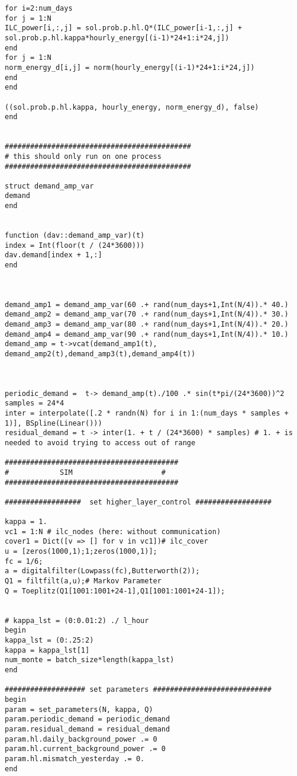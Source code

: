 \begin{lstlisting}
for i=2:num_days
for j = 1:N
ILC_power[i,:,j] = sol.prob.p.hl.Q*(ILC_power[i-1,:,j] +  sol.prob.p.hl.kappa*hourly_energy[(i-1)*24+1:i*24,j])
end
for j = 1:N
norm_energy_d[i,j] = norm(hourly_energy[(i-1)*24+1:i*24,j])
end
end

((sol.prob.p.hl.kappa, hourly_energy, norm_energy_d), false)
end


############################################
# this should only run on one process
############################################

struct demand_amp_var
demand
end


function (dav::demand_amp_var)(t)
index = Int(floor(t / (24*3600)))
dav.demand[index + 1,:]
end



demand_amp1 = demand_amp_var(60 .+ rand(num_days+1,Int(N/4)).* 40.)
demand_amp2 = demand_amp_var(70 .+ rand(num_days+1,Int(N/4)).* 30.)
demand_amp3 = demand_amp_var(80 .+ rand(num_days+1,Int(N/4)).* 20.)
demand_amp4 = demand_amp_var(90 .+ rand(num_days+1,Int(N/4)).* 10.)
demand_amp = t->vcat(demand_amp1(t), demand_amp2(t),demand_amp3(t),demand_amp4(t))



periodic_demand =  t-> demand_amp(t)./100 .* sin(t*pi/(24*3600))^2
samples = 24*4
inter = interpolate([.2 * randn(N) for i in 1:(num_days * samples + 1)], BSpline(Linear()))
residual_demand = t -> inter(1. + t / (24*3600) * samples) # 1. + is needed to avoid trying to access out of range

#########################################
#            SIM                     #
#########################################

##################  set higher_layer_control ##################

kappa = 1.
vc1 = 1:N # ilc_nodes (here: without communication)
cover1 = Dict([v => [] for v in vc1])# ilc_cover
u = [zeros(1000,1);1;zeros(1000,1)];
fc = 1/6;
a = digitalfilter(Lowpass(fc),Butterworth(2));
Q1 = filtfilt(a,u);# Markov Parameter
Q = Toeplitz(Q1[1001:1001+24-1],Q1[1001:1001+24-1]);


# kappa_lst = (0:0.01:2) ./ l_hour
begin
kappa_lst = (0:.25:2)
kappa = kappa_lst[1]
num_monte = batch_size*length(kappa_lst)
end

################### set parameters ############################
begin
param = set_parameters(N, kappa, Q)
param.periodic_demand = periodic_demand
param.residual_demand = residual_demand
param.hl.daily_background_power .= 0
param.hl.current_background_power .= 0
param.hl.mismatch_yesterday .= 0.
end


\end{lstlisting}
